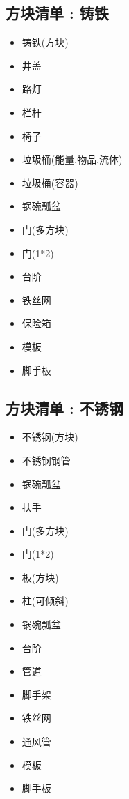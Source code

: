 {  \subsection{方块清单 : 铸铁}{
      \begin{itemize}
          \item 铸铁(方块)
          \item 井盖
          \item 路灯
          \item 栏杆
          \item 椅子
          \item 垃圾桶(能量,物品,流体)
          \item 垃圾桶(容器)
          \item 锅碗瓢盆
          \item 门(多方块)
          \item 门(1*2)
          \item 台阶
          \item 铁丝网
          \item 保险箱
          \item 模板
          \item 脚手板
      \end{itemize}
  }

  \subsection{方块清单 : 不锈钢}{
      \begin{itemize}
          \item 不锈钢(方块)
          \item 不锈钢钢管
          \item 锅碗瓢盆
          \item 扶手
          \item 门(多方块)
          \item 门(1*2)
          \item 板(方块)
          \item 柱(可倾斜)
          \item 锅碗瓢盆
          \item 台阶
          \item 管道
          \item 脚手架
          \item 铁丝网
          \item 通风管
          \item 模板
          \item 脚手板
      \end{itemize}
  }

}
